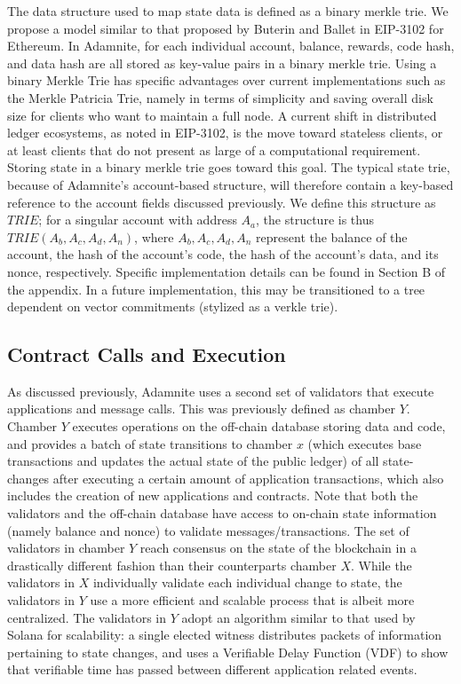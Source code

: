 \documentclass[conference]{IEEEtran}
\begin{document}
The data structure used to map state data is defined as a binary merkle trie. We propose a model similar to that proposed by Buterin and Ballet in EIP-3102 for Ethereum. In Adamnite, for each individual account, balance, rewards, code hash, and data hash are all stored as key-value pairs in a binary merkle trie. Using a binary Merkle Trie has specific advantages over current implementations such as the Merkle Patricia Trie, namely in terms of simplicity and saving overall disk size for clients who want to maintain a full node. A current shift in distributed ledger ecosystems, as noted in EIP-3102, is the move toward stateless clients, or at least clients that do not present as large of a computational requirement. Storing state in a binary merkle trie goes toward this goal. The typical state trie, because of Adamnite's account-based structure, will therefore contain a key-based reference to the account fields discussed previously. We define this structure as $TRIE$; for a singular account with address $A_a$, the structure is thus $TRIE(A_b, A_c, A_d, A_n)$, where $A_b, A_c, A_d, A_n$ represent the balance of the account, the hash of the account's code, the hash of the account's data, and its nonce, respectively. Specific implementation details can be found in Section B of the appendix. In a future implementation, this may be transitioned to a tree dependent on vector commitments (stylized as a verkle trie).\\


\subsection{Contract Calls and Execution}

As discussed previously, Adamnite uses a second set of validators that execute applications and message calls. This was previously defined as chamber $Y$. Chamber $Y$ executes operations on the off-chain database storing data and code, and provides a batch of state transitions to chamber $x$ (which executes base transactions and updates the actual state of the public ledger) of all state-changes after executing a certain amount of application transactions, which also includes the creation of new applications and contracts. Note that both the validators and the off-chain database have access to on-chain state information (namely balance and nonce) to validate messages/transactions. The set of validators in chamber $Y$ reach consensus on the state of the blockchain in a drastically different fashion than their counterparts chamber $X$. While the validators in $X$ individually validate each individual change to state, the validators in $Y$ use a more efficient and scalable process that is albeit more centralized. The validators in $Y$ adopt an algorithm similar to that used by Solana for scalability: a single elected witness distributes packets of information pertaining to state changes, and uses a Verifiable Delay Function (VDF) to show that verifiable time has passed between different application related events.\\
\end{document}
